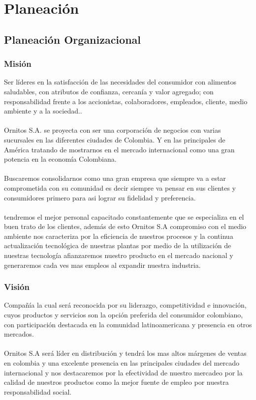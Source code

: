 \chapter{Planeaci\'on}
\section{Planeaci\'on Organizacional}
\subsection{Misi\'on}
Ser l\'ideres en la satisfacci\'on de las necesidades del consumidor con alimentos saludables, con atributos de confianza, cercan\'ia y valor agregado; con responsabilidad frente a los accionistas, colaboradores, empleados, cliente, medio ambiente y a la sociedad..%
\\%
\\%
Ornitos S.A. se proyecta con ser  una corporaci\'on de negocios con varias sucursales en las diferentes ciudades de  Colombia. Y en las principales de Am\'erica tratando de mostrarnos en el mercado internacional como una gran potencia en la economía Colombiana.
\\%
\\%
Buscaremos consolidarnos como una gran empresa que siempre va a estar comprometida con su comunidad es decir siempre va pensar en sus clientes y consumidores primero para asi lograr su fidelidad y preferencia.
\\%
\\%
tendremos el mejor personal capacitado constantemente que se especializa en el buen trato de los clientes, además de esto Ornitos S.A compromiso con el medio ambiente nos caracteriza por la eficiencia de nuestros procesos y la continua actualizaci\'on tecnol\'ogica de nuestras plantas por medio de la utilizaci\'on de nuestras tecnolog\'ia afianzaremos nuestro producto en el mercado nacional y generaremos cada ves mas empleos al expandir nuestra industria.
%
\subsection{Visi\'on}
Compa\~n\'ia la cual ser\'a reconocida por su liderazgo, competitividad e innovaci\'on, cuyos productos y servicios son la opci\'on preferida del consumidor colombiano, con participaci\'on destacada en la comunidad latinoamericana y presencia en otros mercados.
\\%
\\%
Ornitos S.A ser\'a l\'ider en distribuci\'on y tendr\'a los mas altos m\'argenes de ventas en colombia y una excelente presencia en las principales ciudades del mercado internacional y nos destacaremos por la efectividad de nuestro mercadeo por la calidad de nuestros productos como la mejor fuente de empleo por nuestra responsabilidad social.
